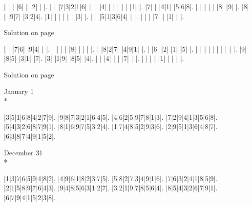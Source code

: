 \documentclass[twoside,letterpaper]{book}
\renewcommand*\sudokuformat[1]{\huge\sffamily#1}
\begin{document}
\pagestyle{fancy}
\fancyhead{}
\fancyfoot{}
\fancyfoot[RO,LE]{\thepage}
\renewcommand{\footrulewidth}{0.2pt}
\renewcommand{\headrulewidth}{0.2pt}

\begin{center}
\vspace*{1in}
\begin{sudoku}
| | | |6| | |2| | |.
| | |7|3|2|1|6| | |.
|4| | | | | | |1| |.
|7| | |4|1| |5|6|8|.
| | | | | |8| |9| |.
|8| | |9|7| |3|2|4|.
|1| | | | | | |3| |.
| | |5|1|3|6|4| | |.
| | | |7| | |1| | |.
\end{sudoku}
\vspace*{1in}
\footnotesize
Solution on page \pageref{puzzle55977}
\newpage
\vspace*{1in}
\begin{sudoku}
| | |7|6| |9|4| | |.
| | | | |8| | | | |.
| |8|2|7| |4|9|1| |.
| |6| |2| |1| |5| |.
| | | | | | | | | |.
|9| |8|5| |3|1| |7|.
|3| |1|9| |8|5| |4|.
| | |4| | | |7| | |.
| | | | |1| | | | |.
\end{sudoku}
\vspace*{1in}
\footnotesize
Solution on page \pageref{puzzle34259}
\newpage
\newpage
\setlength\sudokusize{4cm}
\setlength\sudokuthickline{1pt}
\setlength\sudokuthinline{0.1pt}
\renewcommand*\sudokuformat[1]{\normalsize\sffamily#1}
\footnotesize
{}
\fancyfoot[RE,LO]{}
\setlength{\columnsep}{15pt}
\begin{multicols}{2}
January 1\label{puzzle55977}\\*
\vspace{0.1in}
\begin{sudoku}
|3|5|1|6|8|4|2|7|9|.
|9|8|7|3|2|1|6|4|5|.
|4|6|2|5|9|7|8|1|3|.
|7|2|9|4|1|3|5|6|8|.
|5|4|3|2|6|8|7|9|1|.
|8|1|6|9|7|5|3|2|4|.
|1|7|4|8|5|2|9|3|6|.
|2|9|5|1|3|6|4|8|7|.
|6|3|8|7|4|9|1|5|2|.
\end{sudoku}
\vfill
December 31\label{puzzle34259}\\*
\vspace{0.1in}
\begin{sudoku}
|1|3|7|6|5|9|4|8|2|.
|4|9|6|1|8|2|3|7|5|.
|5|8|2|7|3|4|9|1|6|.
|7|6|3|2|4|1|8|5|9|.
|2|1|5|8|9|7|6|4|3|.
|9|4|8|5|6|3|1|2|7|.
|3|2|1|9|7|8|5|6|4|.
|8|5|4|3|2|6|7|9|1|.
|6|7|9|4|1|5|2|3|8|.
\end{sudoku}
\vfill
\end{multicols}
\end{center}
\end{document}
